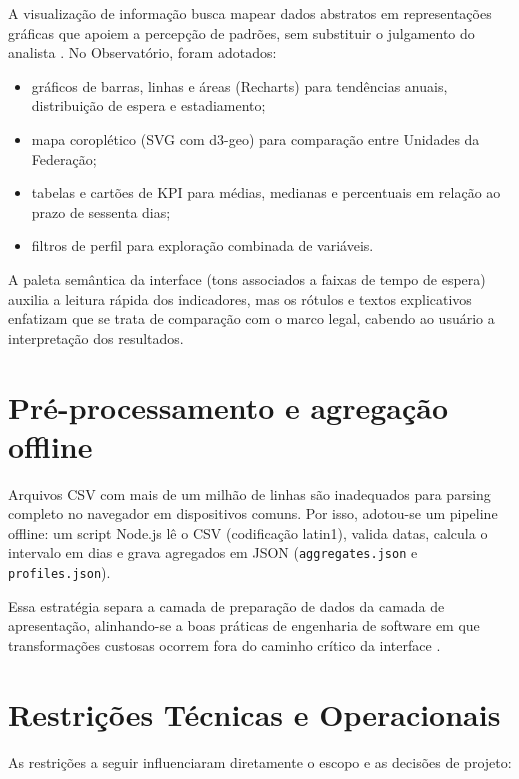 A visualização de informação busca mapear dados abstratos em representações gráficas que apoiem a percepção de padrões, sem substituir o julgamento do analista \cite{few2009}. No Observatório, foram adotados:

\begin{itemize}
	\item gráficos de barras, linhas e áreas (Recharts) para tendências anuais, distribuição de espera e estadiamento;
	\item mapa coroplético (\acs{SVG} com d3-geo) para comparação entre Unidades da Federação;
	\item tabelas e cartões de \acs{KPI} para médias, medianas e percentuais em relação ao prazo de sessenta dias;
	\item filtros de perfil para exploração combinada de variáveis.
\end{itemize}

A paleta semântica da interface (tons associados a faixas de tempo de espera) auxilia a leitura rápida dos indicadores, mas os rótulos e textos explicativos enfatizam que se trata de comparação com o marco legal, cabendo ao usuário a interpretação dos resultados.

\section{Pré-processamento e agregação offline}

Arquivos \acs{CSV} com mais de um milhão de linhas são inadequados para parsing completo no navegador em dispositivos comuns. Por isso, adotou-se um pipeline offline: um script Node.js lê o \acs{CSV} (codificação latin1), valida datas, calcula o intervalo em dias e grava agregados em \acs{JSON} (\texttt{aggregates.json} e \texttt{profiles.json}).

Essa estratégia separa a camada de preparação de dados da camada de apresentação, alinhando-se a boas práticas de engenharia de software em que transformações custosas ocorrem fora do caminho crítico da interface \cite{sommerville2011}.

\section{Restrições Técnicas e Operacionais}

As restrições a seguir influenciaram diretamente o escopo e as decisões de projeto:

